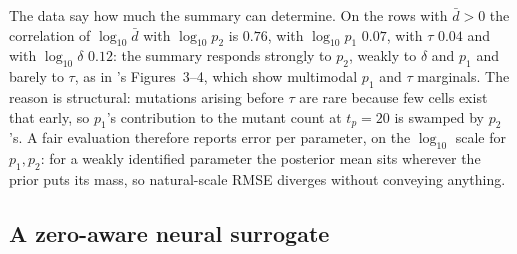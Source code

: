 \documentclass[sn-basic,iicol,pdflatex]{sn-jnl}
\begin{document}
The data say how much the summary can determine. On the rows with $\bar d>0$ the
correlation of $\log_{10}\bar d$ with $\log_{10}p_2$ is $0.76$, with
$\log_{10}p_1$ $0.07$, with $\tau$ $0.04$ and with $\log_{10}\delta$ $0.12$: the summary responds strongly to $p_2$, weakly to
$\delta$ and $p_1$ and barely to $\tau$, as in
\citeauthor{lu2023}'s Figures~3--4, which show multimodal $p_1$ and $\tau$
marginals. The reason is structural: mutations arising before $\tau$ are rare
because few cells exist that early, so $p_1$'s contribution to the mutant count
at $t_p=20$ is swamped by $p_2$'s. A fair evaluation therefore reports error
per parameter, on the $\log_{10}$ scale for $p_1,p_2$: for a weakly identified
parameter the posterior mean sits wherever the prior puts its mass, so
natural-scale RMSE diverges without conveying anything.

\subsection{A zero-aware neural surrogate}
\label{sec:hurdle}
\end{document}
